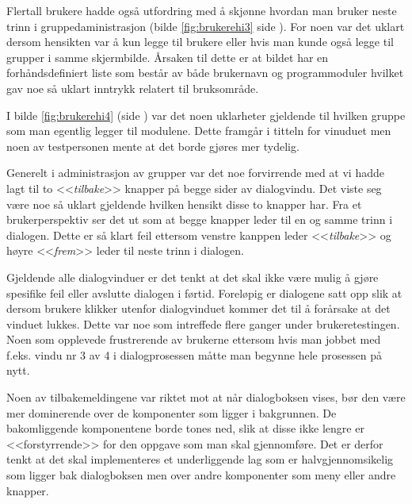 Flertall brukere hadde også utfordring med å skjønne hvordan man bruker neste trinn i gruppedaministrasjon (bilde \ref{fig:brukerehi3} side \pageref{fig:brukerehi3}). For noen var det uklart dersom hensikten var å kun legge til brukere eller hvis man kunde også legge til grupper i samme skjermbilde. Årsaken til dette er at bildet har en forhåndsdefiniert liste som består av både brukernavn og programmoduler hvilket gav noe så uklart inntrykk relatert til bruksområde.

I bilde \ref{fig:brukerehi4} (side \pageref{fig:brukerehi4}) var det noen uklarheter gjeldende til hvilken gruppe som man egentlig legger til modulene. Dette framgår i titteln for vinuduet men noen av testpersonen mente at det borde gjøres mer tydelig. 

Generelt i administrasjon av grupper var det noe forvirrende med at vi hadde lagt til to <<\textit{tilbake}>> knapper på begge sider av dialogvindu. Det viste seg være noe så uklart gjeldende hvilken hensikt disse to knapper har. Fra et brukerperspektiv ser det ut som at begge knapper leder til en og samme trinn i dialogen. Dette er så klart feil ettersom venstre kanppen leder <<\textit{tilbake}>> og høyre <<\textit{frem}>> leder til neste trinn i dialogen.

Gjeldende alle dialogvinduer er det tenkt at det skal ikke være mulig å gjøre spesifike feil eller avslutte dialogen i førtid. Foreløpig er dialogene satt opp slik at dersom brukere klikker utenfor dialogvinduet kommer det til å forårsake at det vinduet lukkes. Dette var noe som intreffede flere ganger under brukeretestingen. Noen som opplevede frustrerende av brukerne ettersom hvis man jobbet med f.eks. vindu nr 3 av 4 i dialogprosessen måtte man begynne hele prosessen på nytt.

Noen av tilbakemeldingene var riktet mot at når dialogboksen vises, bør den være mer dominerende over de komponenter som ligger i bakgrunnen. De bakomliggende komponentene borde tones ned, slik at disse ikke lengre er <<forstyrrende>> for den oppgave som man skal gjennomføre. Det er derfor tenkt at det skal implementeres et underliggende lag som er halvgjennomsikelig som ligger bak dialogboksen men over andre komponenter som meny eller andre knapper.